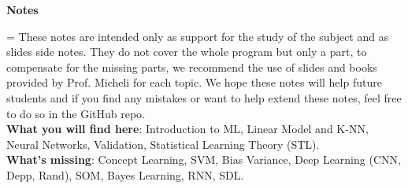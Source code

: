 \documentclass{article}
\theoremstyle{definition}
\theoremstyle{remark}
\begin{document}

\cleardoublepage
\centerline{\large\bfseries Notes}
\nobreak
\vspace{1pc}
\begingroup\small
{}\textwidth
\rightskip=\leftskip
These notes are intended only as support for the study of the subject and as slides side notes. They do not cover the whole program but only a part, to compensate for the missing parts, we recommend the use of slides and books provided by Prof. Micheli for each topic. We hope these notes will help future students and if you find any mistakes or want to help extend these notes, feel free to do so in the GitHub repo.\\

\noindent \textbf{What you will find here}: Introduction to ML, Linear Model and K-NN, Neural Networks, Validation, Statistical Learning Theory (STL).\\

\noindent \textbf{What's missing}: Concept Learning, SVM, Bias Variance, Deep Learning (CNN, Depp, Rand), SOM, Bayes Learning, RNN, SDL.\\

\par\endgroup
\clearpage


\newpage
\enlargethispage{2\baselineskip}
\tableofcontents
\let\tableofcontents\relax
\newpage



\newpage

\newpage

\newpage

\newpage

\newpage

%
%
\end{document}
